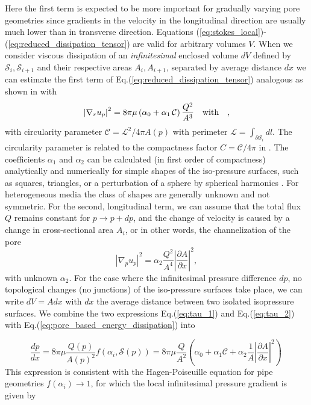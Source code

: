 \documentclass[draft]{agujournal2019}
\begin{document}
Here the first term is expected to be more important for gradually varying pore geometries since gradients in the velocity in the longitudinal direction are usually much lower than in transverse direction. Equations (\ref{eq:stokes_local})-(\ref{eq:reduced_dissipation_tensor}) are valid for arbitrary volumes $V$. When we consider viscous dissipation of an \textit{infinitesimal} enclosed volume $dV$ defined by $\mathcal{S}_i,\mathcal{S}_{i+1}$ and their respective areas $A_i, A_{i+1}$, separated by average distance $dx$ we can estimate the first term of Eq.(\ref{eq:reduced_dissipation_tensor}) analogous as shown in \cite{mortensen_reexamination_2005} with
\begin{equation}
	\left|\nabla_r u_p\right|^2 =8\pi\mu \left(\alpha_0+\alpha_1\,\mathcal{C}\right)\frac{ Q^2}{A^3}~~~ \rm{with}~~~ ,\label{eq:tau_1}
\end{equation}
with circularity parameter $\mathcal{C} = \mathcal{L}^2/4\pi A(p)$ with perimeter $\mathcal{L} = \int_{\partial \mathcal{S}_i}dl$. The circularity parameter is related to the compactness factor $C = \mathcal{C}/4\pi$ in \cite{mortensen_reexamination_2005}. The coefficients $\alpha_1$ and $\alpha_2$ can be calculated (in first order of compactness) analytically and numerically for simple shapes of the iso-pressure surfaces, such as squares, triangles, or a perturbation of a sphere by spherical harmonics . For heterogeneous media the class of shapes are generally unknown and not symmetric. 
For the second, longitudinal term, we can assume that the total flux $Q$ remains constant for $p\rightarrow p+dp$, and the change of velocity is caused by a change in cross-sectional area $A_i$, or in other words, the channelization of the pore 
\begin{equation}
	\left|\nabla_p u_p\right|^2 = \alpha_2  \frac{Q^2}{A^4}\left|\frac{\partial A}{\partial x }\right|^2,\label{eq:tau_2}
\end{equation}
with unknown $\alpha_2$. For the case where the infinitesimal pressure difference $dp$, no topological changes (no junctions) of the iso-pressure surfaces take place, we can write $dV = A dx$ with $dx$ the average distance between two isolated isopressure surfaces. We  combine the two expressions Eq.(\ref{eq:tau_1}) and Eq.(\ref{eq:tau_2}) with Eq.(\ref{eq:pore_based_energy_dissipation}) into

\begin{equation}
	\frac{dp}{dx} = 8\pi \mu \frac{Q(p)}{A(p)^2} f\left(\alpha_i,\mathcal{S}(p) \right) = 8 \pi \mu\frac{Q}{A^2}\left(\alpha_0+\alpha_1\mathcal{C} + \alpha_2 \frac{1}{A}\left|\frac{\partial A}{\partial x}\right|^2\right)\,\label{eq:infi_dp}
\end{equation}
This expression is consistent with the Hagen-Poiseuille equation for pipe geometries $f(\alpha_i)\rightarrow 1$, for which the local infinitesimal pressure gradient is given by 
\end{document}
